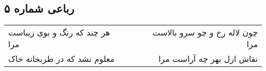 \begin{center}
\section*{رباعی شماره ۵}
\label{sec:sh005}
\begin{longtable}{l p{0.5cm} r}
هر چند که رنگ و بوی زیباست مرا
&&
چون لاله رخ و چو سرو بالاست مرا
\\
معلوم نشد که در طربخانه خاک
&&
نقاش ازل بهر چه آراست مرا
\\
\end{longtable}
\end{center}
